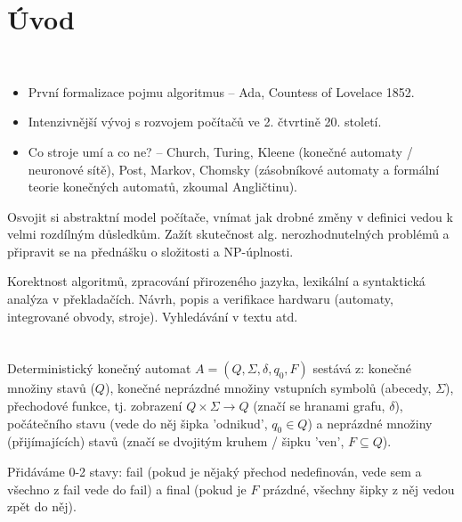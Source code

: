 \documentclass[12pt]{article}                   %
\begin{document}
\section{Úvod}
    \begin{poznamka}[Historie]
        \ 
        \begin{itemize}
            \item První formalizace pojmu algoritmus -- Ada, Countess of Lovelace 1852.
            \item Intenzivnější vývoj s rozvojem počítačů ve 2. čtvrtině 20. století.
            \item Co stroje umí a co ne? -- Church, Turing, Kleene (konečné automaty / neuronové sítě), Post, Markov, Chomsky (zásobníkové automaty a formální teorie konečných automatů, zkoumal Angličtinu).
        \end{itemize}
    \end{poznamka}

    \begin{poznamka}[Cíl]
        Osvojit si abstraktní model počítače, vnímat jak drobné změny v definici vedou k velmi rozdílným důsledkům. Zažít skutečnost alg. nerozhodnutelných problémů a připravit se na přednášku o složitosti a NP-úplnosti.
    \end{poznamka}

    \begin{poznamka}
        Korektnost algoritmů, zpracování přirozeného jazyka, lexikální a syntaktická analýza v překladačích. Návrh, popis a verifikace hardwaru (automaty, integrované obvody, stroje). Vyhledávání v textu atd.
    \end{poznamka}

\section{}
    \begin{definice}
        Deterministický konečný automat $A = (Q, \Sigma, \delta, q_0, F)$ sestává z: konečné množiny stavů ($Q$), konečné neprázdné množiny vstupních symbolů (abecedy, $\Sigma$), přechodové funkce, tj. zobrazení $Q \times \Sigma \rightarrow Q$ (značí se hranami grafu, $\delta$), počátečního stavu (vede do něj šipka 'odnikud', $q_0 \in Q$) a neprázdné množiny (přijímajících) stavů (značí se dvojitým kruhem / šipku 'ven', $F \subseteq Q$).
    
        \begin{umluvain}
            Přidáváme 0-2 stavy: fail (pokud je nějaký přechod nedefinován, vede sem a všechno z fail vede do fail) a final (pokud je $F$ prázdné, všechny šipky z něj vedou zpět do něj).
        \end{umluvain}
    \end{definice}
\end{document}

